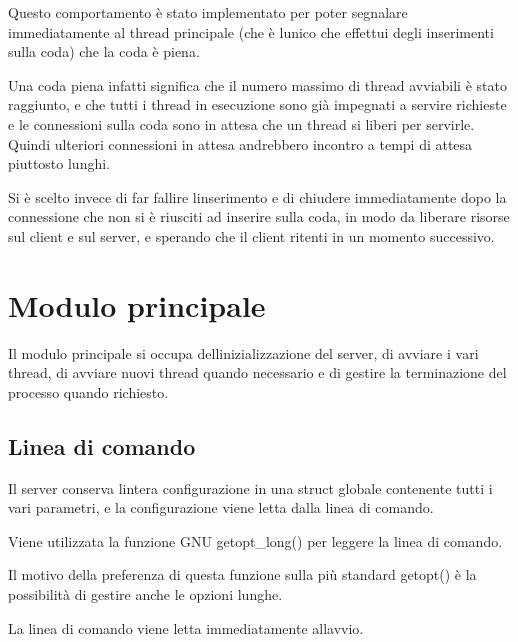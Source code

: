 \documentclass[a4paper,11pt]{article}
\begin{document}
{\sffamily
Questo comportamento \`e stato implementato per poter segnalare
immediatamente al thread principale (che \`e l{\textquotesingle}unico
che effettui degli inserimenti sulla coda) che la coda \`e piena.}


\bigskip

{\sffamily
Una coda piena infatti significa che il numero massimo di thread
avviabili \`e stato raggiunto, e che tutti i thread in esecuzione sono
gi\`a impegnati a servire richieste e le connessioni sulla coda sono in
attesa che un thread si liberi per servirle. Quindi ulteriori
connessioni in attesa andrebbero incontro a tempi di attesa piuttosto
lunghi.}

{\sffamily
Si \`e scelto invece di far fallire l{\textquotesingle}inserimento e di
chiudere immediatamente dopo la connessione che non si \`e riusciti ad
inserire sulla coda, in modo da liberare risorse sul client e sul
server, e sperando che il client ritenti in un momento successivo.}


\bigskip

\section{Modulo principale}
{\sffamily
Il modulo principale si occupa dell{\textquotesingle}inizializzazione
del server, di avviare i vari thread, di avviare nuovi thread quando
necessario e di gestire la terminazione del processo quando richiesto.}


\bigskip

\subsection{Linea di comando}
{\sffamily
Il server conserva l{\textquotesingle}intera configurazione in una
struct globale contenente tutti i vari parametri, e la configurazione
viene letta dalla linea di comando.}


\bigskip

{\sffamily
Viene utilizzata la funzione GNU getopt\_long() per leggere la linea di
comando.}

{\sffamily
Il motivo della preferenza di questa funzione sulla pi\`u standard
getopt() \`e la possibilit\`a di gestire anche le opzioni
lunghe\cite{LIBC07}.}


\bigskip

{\sffamily
La linea di comando viene letta immediatamente
all{\textquotesingle}avvio.}


\bigskip
\end{document}
